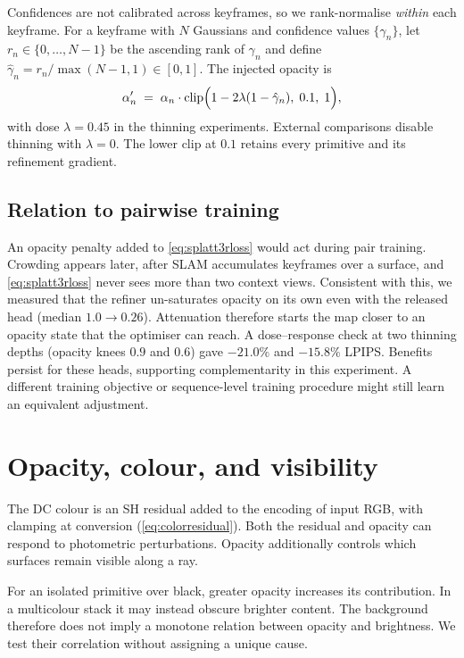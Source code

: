 Confidences are not calibrated across keyframes, so we rank-normalise
\emph{within} each keyframe. For a keyframe with $N$ Gaussians and confidence
values $\{\gamma_n\}$, let $r_n\in\{0,\ldots,N-1\}$ be the ascending rank of
$\gamma_n$ and define
$\hat{\gamma}_n=r_n/\max(N-1,1)\in[0,1]$. The injected opacity is
\begin{equation}
\alpha'_n \;=\; \alpha_n \cdot
\mathrm{clip}\Bigl(1-2\lambda(1-\hat{\gamma}_n),\;0.1,\;1\Bigr),
\label{eq:thin}
\end{equation}
with dose $\lambda{=}0.45$ in the thinning experiments. External comparisons
disable thinning with $\lambda=0$. The lower clip at $0.1$ retains every
primitive and its refinement gradient.

\subsection{Relation to pairwise training}
An opacity penalty added to \cref{eq:splatt3rloss} would act during pair
training. Crowding appears later, after SLAM accumulates
keyframes over a surface, and \cref{eq:splatt3rloss} never sees more than two
context views. Consistent with this, we measured that the refiner
un-saturates opacity on its own even with the released head (median
$1.0\rightarrow0.26$). Attenuation therefore starts the map closer to an
opacity state that the optimiser can reach. A dose--response check at two
thinning depths (opacity knees $0.9$ and $0.6$) gave $-21.0\%$ and
$-15.8\%$ LPIPS. Benefits persist for these heads, supporting complementarity
in this experiment. A different training objective or sequence-level
training procedure might still learn an equivalent adjustment.

\section{Opacity, colour, and visibility}
\label{sec:method:mech}

The DC colour is an SH residual added to the encoding of input RGB, with
clamping at conversion (\cref{eq:colorresidual}). Both the residual and
opacity can respond to photometric perturbations. Opacity additionally
controls which surfaces remain visible along a ray.

For an isolated primitive over black, greater opacity increases its
contribution. In a multicolour stack it may instead obscure brighter content.
The background therefore does not imply a monotone relation between opacity
and brightness. We test their correlation without assigning a unique cause.

